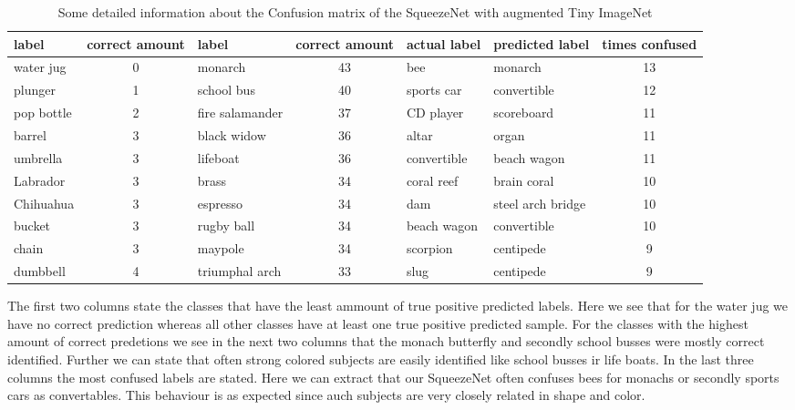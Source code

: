 \documentclass[11pt]{article}
\begin{document}
\begin{table}[h]
\begin{tabular}{lc|lc|llc}
\toprule
             label &  correct amount &                    label &  correct amount & actual label &   predicted label &  times confused \\
\midrule
         water jug &               0 &                  monarch &              43 &          bee &           monarch &              13 \\
           plunger &               1 &               school bus &              40 &   sports car &       convertible &              12 \\
        pop bottle &               2 & fire salamander &              37 &    CD player &        scoreboard &              11 \\
            barrel &               3 &              black widow &              36 &        altar &             organ &              11 \\
          umbrella &               3 &                 lifeboat &              36 &  convertible &       beach wagon &              11 \\
Labrador  &               3 &                    brass &              34 &   coral reef &       brain coral &              10 \\
         Chihuahua &               3 &                 espresso &              34 &          dam & steel arch bridge &              10 \\
            bucket &               3 &               rugby ball &              34 &  beach wagon &       convertible &              10 \\
             chain &               3 &                  maypole &              34 &     scorpion &         centipede &               9 \\
          dumbbell &               4 &           triumphal arch &              33 &         slug &         centipede &               9 \\
\bottomrule
\end{tabular}
\caption{Some detailed information about the Confusion matrix of the SqueezeNet with augmented Tiny ImageNet }
\label{rescnn::7}
\end{table}

The first two columns state the classes that have the least ammount of true positive predicted labels. Here we see that for the water jug we have no correct prediction whereas all other classes have at least one true positive predicted sample. For the classes with the highest amount of correct predetions we see in the next two columns that the monach butterfly and secondly school busses were mostly correct identified. Further we can state that often strong colored subjects are easily identified like school busses ir life boats. In the last three columns the most confused labels are stated. Here we can extract that our SqueezeNet often confuses bees for monachs or secondly sports cars as convertables. This behaviour is as expected since auch subjects are very closely related in shape and color.
\end{document}
